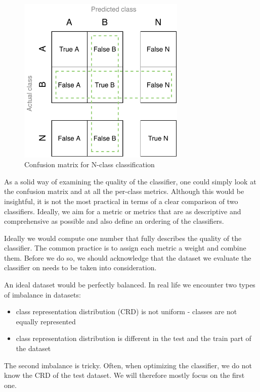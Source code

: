\begin{figure}[h]\centering
\includegraphics[width=80mm]{./img//Diplomka diagramy-Big Confusion matric}
\caption{Confusion matrix for N-class classification}
\label{obr:BigCM}
\end{figure}






As a solid way of examining the quality of the classifier, one could simply look at the confusion matrix and at all the per-class metrics. Although this would be insightful, it is not the most practical in terms of a clear comparison of two classifiers. Ideally, we aim for a metric or metrics that are as descriptive and comprehensive as possible and also define an ordering of the classifiers.

Ideally we would compute one number that fully describes the quality of the classifier. The common practice is to assign each metric a weight and combine them. Before we do so, we should acknowledge that the dataset we evaluate the classifier on needs to be taken into consideration.

An ideal dataset would be perfectly balanced. In real life we encounter two types of imbalance in datasets:

\begin{itemize}
\item class representation distribution (CRD) is not uniform - classes are not equally represented 

\item class representation distribution is different in the test and the train part of the dataset
\end{itemize}
The second imbalance is tricky. Often, when optimizing the classifier, we do not know the CRD of the test dataset. We will therefore mostly focus on the first one. 


